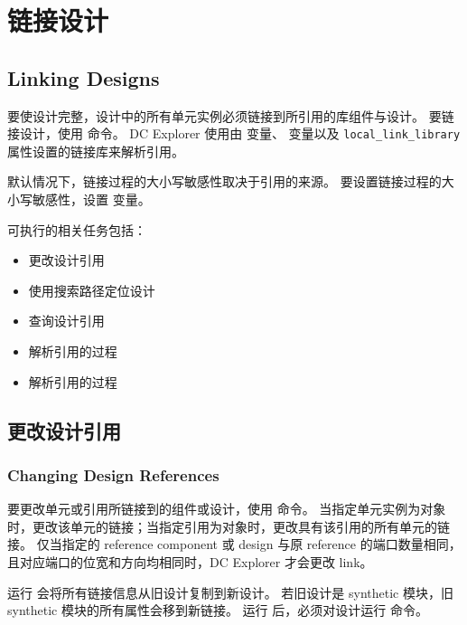 \section{链接设计}
\subsection*{Linking Designs}

要使设计完整，设计中的所有单元实例必须链接到所引用的库组件与设计。
要链接设计，使用  命令。
DC Explorer 使用由  变量、 变量以及 \texttt{local\_link\_library} 属性设置的链接库来解析引用。

默认情况下，链接过程的大小写敏感性取决于引用的来源。
要设置链接过程的大小写敏感性，设置  变量。

可执行的相关任务包括：
\begin{itemize}
  \item 更改设计引用
  \item 使用搜索路径定位设计
  \item 查询设计引用
  \item 解析引用的过程
\end{itemize}

\begin{seeAlsoBox}
\begin{itemize}
  \item 解析引用的过程
\end{itemize}
\end{seeAlsoBox}

\subsection{更改设计引用}
\subsubsection*{Changing Design References}

要更改单元或引用所链接到的组件或设计，使用  命令。
当指定单元实例为对象时，更改该单元的链接；当指定引用为对象时，更改具有该引用的所有单元的链接。
仅当指定的 reference component 或 design 与原 reference 的端口数量相同，且对应端口的位宽和方向均相同时，DC Explorer 才会更改 link。

运行  会将所有链接信息从旧设计复制到新设计。
若旧设计是 synthetic 模块，旧 synthetic 模块的所有属性会移到新链接。
运行  后，必须对设计运行  命令。

